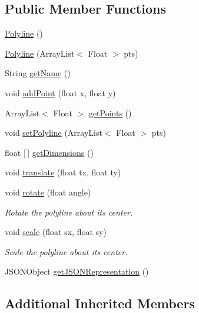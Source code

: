 \subsection*{Public Member Functions}
\begin{DoxyCompactItemize}
\item 
\hyperlink{classbridges_1_1base_1_1_polyline_a8842a3d3737dfa5b26424a05dc965a4b}{Polyline} ()
\item 
\hyperlink{classbridges_1_1base_1_1_polyline_a11d14fddddd6e89e0902e94aa1bac875}{Polyline} (Array\+List$<$ Float $>$ pts)
\item 
String \hyperlink{classbridges_1_1base_1_1_polyline_a5b56cee642a6381ea940c75a336076ea}{get\+Name} ()
\item 
void \hyperlink{classbridges_1_1base_1_1_polyline_a24b99307181f1a938ea408355984d191}{add\+Point} (float x, float y)
\item 
Array\+List$<$ Float $>$ \hyperlink{classbridges_1_1base_1_1_polyline_ae610d680975558db90a06949991583f8}{get\+Points} ()
\item 
void \hyperlink{classbridges_1_1base_1_1_polyline_a3fec0c95e9f26b173cba105bd39e9df1}{set\+Polyline} (Array\+List$<$ Float $>$ pts)
\item 
float \mbox{[}$\,$\mbox{]} \hyperlink{classbridges_1_1base_1_1_polyline_a5665bd906b841ca71a668581aeb7a181}{get\+Dimensions} ()
\item 
void \hyperlink{classbridges_1_1base_1_1_polyline_a8c0589441852bb08f223004d948818f1}{translate} (float tx, float ty)
\item 
void \hyperlink{classbridges_1_1base_1_1_polyline_ad0bb71fa4d15e2b3afc6fd26636a7931}{rotate} (float angle)
\begin{DoxyCompactList}\small\item\em Rotate the polyline about its center. \end{DoxyCompactList}\item 
void \hyperlink{classbridges_1_1base_1_1_polyline_a5f07434dd7f07b68ac6a57ad267ad25c}{scale} (float sx, float sy)
\begin{DoxyCompactList}\small\item\em Scale the polyline about its center. \end{DoxyCompactList}\item 
J\+S\+O\+N\+Object \hyperlink{classbridges_1_1base_1_1_polyline_a4ac266909645f8db9b7fcc4836f6069a}{get\+J\+S\+O\+N\+Representation} ()
\end{DoxyCompactItemize}
\subsection*{Additional Inherited Members}


